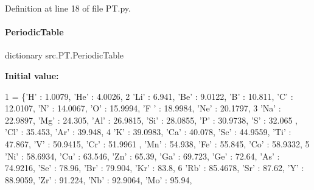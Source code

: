 Definition at line 18 of file P\+T.\+py.

\mbox{\label{namespacesrc_1_1PT_acefe79d28cfa375c7875d72dba4fae6a}} 
\paragraph{\texorpdfstring{Periodic\+Table}{PeriodicTable}}
{\footnotesize\ttfamily dictionary src.\+P\+T.\+Periodic\+Table}

{\bfseries Initial value\+:}
\begin{DoxyCode}
1 =  \{\textcolor{stringliteral}{'H'} : 1.0079, \textcolor{stringliteral}{'He'} : 4.0026, 
2                  \textcolor{stringliteral}{'Li'} : 6.941, \textcolor{stringliteral}{'Be'} : 9.0122, \textcolor{stringliteral}{'B'} : 10.811, \textcolor{stringliteral}{'C'} : 12.0107, \textcolor{stringliteral}{'N'} : 14.0067, \textcolor{stringliteral}{'O'} : 15.9994, \textcolor{stringliteral}{'F
      '} : 18.9984, \textcolor{stringliteral}{'Ne'} : 20.1797,
3                  \textcolor{stringliteral}{'Na'} : 22.9897, \textcolor{stringliteral}{'Mg'} : 24.305, \textcolor{stringliteral}{'Al'} : 26.9815, \textcolor{stringliteral}{'Si'} : 28.0855, \textcolor{stringliteral}{'P'} : 30.9738, \textcolor{stringliteral}{'S'} : 32.065
      , \textcolor{stringliteral}{'Cl'} : 35.453, \textcolor{stringliteral}{'Ar'} : 39.948, 
4                  \textcolor{stringliteral}{'K'} : 39.0983, \textcolor{stringliteral}{'Ca'} : 40.078, \textcolor{stringliteral}{'Sc'} : 44.9559, \textcolor{stringliteral}{'Ti'} : 47.867, \textcolor{stringliteral}{'V'} : 50.9415, \textcolor{stringliteral}{'Cr'} : 51.9961
      , \textcolor{stringliteral}{'Mn'} : 54.938, \textcolor{stringliteral}{'Fe'} : 55.845, \textcolor{stringliteral}{'Co'} : 58.9332, 
5                  \textcolor{stringliteral}{'Ni'} : 58.6934, \textcolor{stringliteral}{'Cu'} : 63.546, \textcolor{stringliteral}{'Zn'} : 65.39, \textcolor{stringliteral}{'Ga'} : 69.723, \textcolor{stringliteral}{'Ge'} : 72.64, \textcolor{stringliteral}{'As'} : 74.9216, \textcolor{stringliteral}{
      'Se'} : 78.96, \textcolor{stringliteral}{'Br'} : 79.904, \textcolor{stringliteral}{'Kr'} : 83.8, 
6                  \textcolor{stringliteral}{'Rb'} : 85.4678, \textcolor{stringliteral}{'Sr'} : 87.62, \textcolor{stringliteral}{'Y'} : 88.9059, \textcolor{stringliteral}{'Zr'} : 91.224, \textcolor{stringliteral}{'Nb'} : 92.9064, \textcolor{stringliteral}{'Mo'} : 95.94, \textcolor{stringliteral}{
}
\end{DoxyCode}
